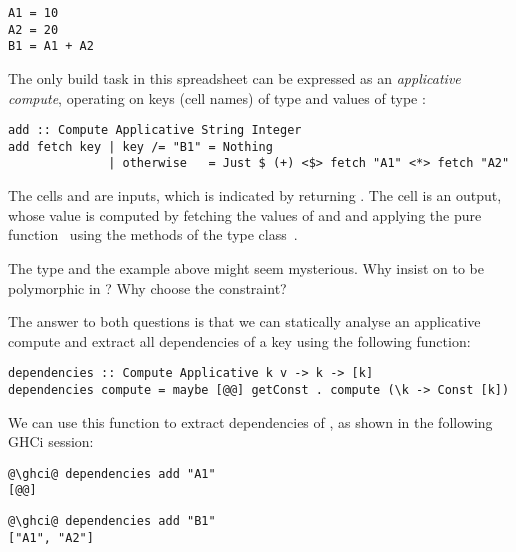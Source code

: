 \vspace{1mm}
\begin{verbatim}
A1 = 10
A2 = 20
B1 = A1 + A2
\end{verbatim}
\vspace{1mm}

\noindent
The only build task in this spreadsheet can be expressed as an \emph{applicative
compute}, operating on keys (cell names) of type  and values of
type :

\vspace{1mm}
\begin{verbatim}
add :: Compute Applicative String Integer
add fetch key | key /= "B1" = Nothing
              | otherwise   = Just $ (+) <$> fetch "A1" <*> fetch "A2"
\end{verbatim}
\vspace{1mm}

\noindent
The cells  and  are inputs, which is indicated by returning
. The cell  is an output, whose value is computed by
fetching the values of  and  and applying the pure
function~\hs{(+)} using the methods of the  type
class~\cite{mcbride2008applicative}.

The  type and the example above might seem mysterious. Why insist on
 to be polymorphic in ? Why choose the 
constraint?

The answer to both questions is that we can statically analyse an applicative
compute and extract all dependencies of a key using the following function:

\vspace{1mm}
\begin{verbatim}
dependencies :: Compute Applicative k v -> k -> [k]
dependencies compute = maybe [@@] getConst . compute (\k -> Const [k])
\end{verbatim}
\vspace{1mm}

\noindent
We can use this function to extract dependencies of , as shown in the
following GHCi session:

\vspace{1mm}
\begin{verbatim}
@\ghci@ dependencies add "A1"
[@@]
\end{verbatim}
\vspace{1mm}
\begin{verbatim}
@\ghci@ dependencies add "B1"
["A1", "A2"]
\end{verbatim}
\vspace{1mm}

